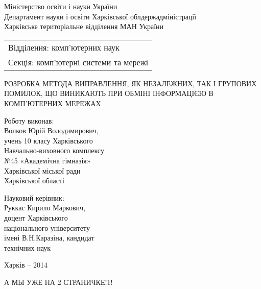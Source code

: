 \documentclass[14pt]{extarticle}
\begin{document}
\begin{titlepage}
\begin{center}
Міністерство освіти і науки України\\
Департамент науки і освіти Харківської облдержадміністрації\\
Харківське територіальне відділення МАН України\\
\end{center}
\par\null\par\null\par
\hfill
\begin{tabular}{@{}l@{}}
Відділення: комп'ютерних наук\\
Секція: комп'ютерні системи та
мережі
\end{tabular}
\par\null\par\null\par
\begin{center}
РОЗРОБКА МЕТОДА ВИПРАВЛЕННЯ, ЯК НЕЗАЛЕЖНИХ, ТАК І ГРУПОВИХ
ПОМИЛОК, ЩО ВИНИКАЮТЬ ПРИ ОБМІНІ ІНФОРМАЦІЄЮ В
КОМП'ЮТЕРНИХ МЕРЕЖАХ
\end{center}
\par\null\par\null\par\null
\begin{changemargin}{10cm}{0cm}
Роботу виконав:\\
Волков Юрій Володимирович,\\
учень 10 класу Харківського\\
Навчально-виховного комплексу\\
№45 «Академічна гімназія»\\
Харківської міської ради\\
Харківської області
\end{changemargin}
\par
\begin{changemargin}{10cm}{0cm}
Науковий керівник:\\
Руккас Кирило Маркович,\\
доцент Харківського\\
національного університету\\
імені В.Н.Каразіна, кандидат\\
технічних наук
\vspace*{\fill}
\end{changemargin}
\begin{center}
Харків -- 2014 
\end{center}
\end{titlepage}
А МЫ УЖЕ НА 2 СТРАНИЧКЕ!1!
\end{document}
